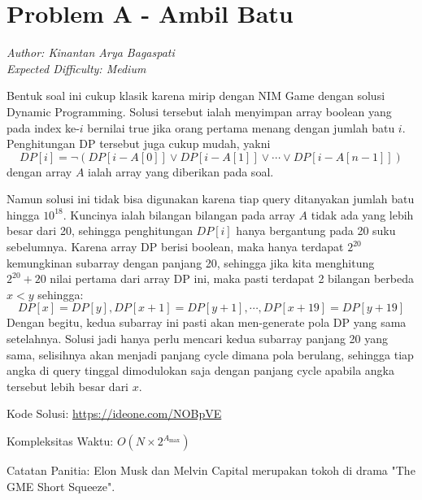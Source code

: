 \section*{Problem A - Ambil Batu}
\textit{Author: Kinantan Arya Bagaspati}
\\
\textit{Expected Difficulty: Medium}

Bentuk soal ini cukup klasik karena mirip dengan NIM Game dengan solusi Dynamic Programming.
Solusi tersebut ialah menyimpan array boolean yang pada index ke-$i$ bernilai true jika orang pertama menang dengan jumlah batu $i$.
Penghitungan DP tersebut juga cukup mudah, yakni 
$$DP[i] = \neg(DP[i-A[0]] \vee DP[i-A[1]] \vee \cdots \vee DP[i-A[n-1]])$$
dengan array $A$ ialah array yang diberikan pada soal.

Namun solusi ini tidak bisa digunakan karena tiap query ditanyakan jumlah batu hingga $10^{18}$.
Kuncinya ialah bilangan bilangan pada array $A$ tidak ada yang lebih besar dari 20,
sehingga penghitungan $DP[i]$ hanya bergantung pada 20 suku sebelumnya.
Karena array DP berisi boolean, maka hanya terdapat $2^{20}$ kemungkinan subarray dengan panjang 20,
sehingga jika kita menghitung $2^{20} + 20$ nilai pertama dari array DP ini, maka pasti terdapat 2 bilangan berbeda $x<y$ sehingga:
$$DP[x] = DP[y], DP[x+1] = DP[y+1], \cdots, DP[x+19] = DP[y+19]$$
Dengan begitu, kedua subarray ini pasti akan men-generate pola DP yang sama setelahnya.
Solusi jadi hanya perlu mencari kedua subarray panjang 20 yang sama, selisihnya akan menjadi panjang cycle dimana pola berulang,
sehingga tiap angka di query tinggal dimodulokan saja dengan panjang cycle apabila angka tersebut lebih besar dari $x$.

Kode Solusi: \url{https://ideone.com/NOBpVE}

Kompleksitas Waktu: $O(N \times 2^{A_{\max}})$

Catatan Panitia: Elon Musk dan Melvin Capital merupakan tokoh di drama "The GME Short Squeeze".
